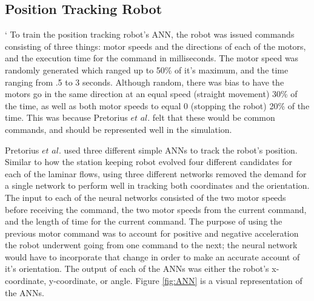 \documentclass{sig-alternate}
\begin{document}
  \subsection{Position Tracking Robot}\label{Pretorius Evolving}`
  To train the position tracking robot's ANN, the robot was issued commands ~\cite{Pretorius:2009:TAN:1632149.1632171}  consisting of three things: motor speeds and the directions of each of the motors, and the execution time for the command in milliseconds. The motor speed was randomly generated which ranged up to 50\% of it's maximum, and the time ranging from .5 to 3 seconds. Although random, there was bias to have the motors go in the same direction at an equal speed (straight movement) 30\% of the time, as well as both motor speeds to equal 0 (stopping the robot) 20\% of the time. This was because  Pretorius $et$ $al.$ felt that these would be common commands, and should be represented well in the simulation.
  
  Pretorius $et$ $al.$ used three different simple ANNs to track the robot's position. Similar to how the station keeping robot evolved four different candidates for each of the laminar flows, using three different networks removed the demand for a single network to perform well in tracking both coordinates and the orientation. The input to each of the neural networks consisted of the two motor speeds before receiving the command, the two motor speeds from the current command, and the length of time for the current command. The purpose of using the previous motor command was to account for positive and negative acceleration the robot underwent going from one command to the next; the neural network would have to incorporate that change in order to make an accurate account of it's orientation. The output of each of the ANNs was either the robot's x-coordinate, y-coordinate, or angle. Figure \ref{fig:ANN} is a visual representation of the ANNs.
  
\end{document}
